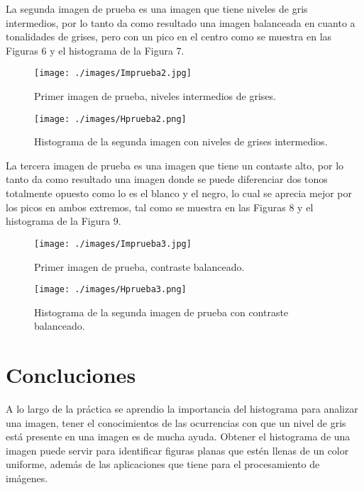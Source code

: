 \documentclass[conference]{IEEEtran}
\begin{document}
\newpage
La segunda imagen de prueba es una imagen que tiene niveles de gris intermedios, por lo tanto da como resultado una imagen balanceada en cuanto a tonalidades de grises, pero con un pico en el centro como se muestra en las Figuras 6 y el histograma de la Figura 7.\\

\begin{figure}[h]
	\begin{center}
		\setlength{\unitlength}{0.00105in}
		\texttt{[image: ./images/Imprueba2.jpg]}
	\end{center}
	\caption{Primer imagen de prueba, niveles intermedios de grises.}
\end{figure}

\begin{figure}[h]
	\begin{center}
		\setlength{\unitlength}{0.00105in}
		\texttt{[image: ./images/Hprueba2.png]}
	\end{center}
	\caption{Histograma de la segunda imagen con niveles de grises intermedios.}
\end{figure}

La tercera imagen de prueba es una imagen que tiene un contaste alto, por lo tanto da como resultado una imagen donde se puede diferenciar dos tonos totalmente opuesto como lo es el blanco y el negro, lo cual se aprecia mejor por los picos en ambos extremos, tal como se muestra en las Figuras 8 y el histograma de la Figura 9.

\begin{figure}[h]
	\begin{center}
		\setlength{\unitlength}{0.00105in}
		\texttt{[image: ./images/Imprueba3.jpg]}
	\end{center}
	\caption{Primer imagen de prueba, contraste balanceado.}
\end{figure}

\begin{figure}[h]
	\begin{center}
		\setlength{\unitlength}{0.00105in}
		\texttt{[image: ./images/Hprueba3.png]}
	\end{center}
	\caption{Histograma de la segunda imagen de prueba con contraste balanceado.}
\end{figure}

\section{Concluciones}
A lo largo de la pr\'actica se aprendio la importancia del histograma para analizar una imagen, tener el conocimientos de las ocurrencias con que un nivel de gris est\'a presente en una imagen es de mucha ayuda. Obtener el histograma de una imagen puede servir para identificar figuras planas que est\'en llenas de un color uniforme, adem\'as de las aplicaciones que tiene para el procesamiento de im\'agenes.
\end{document}
